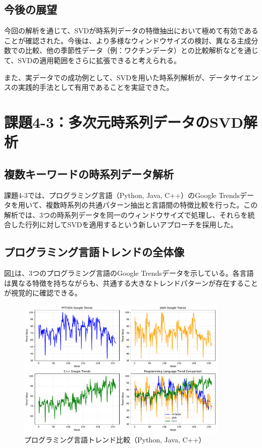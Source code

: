 \documentclass[a4paper,11pt]{jsarticle}
\begin{document}
\subsection{今後の展望}

今回の解析を通じて、SVDが時系列データの特徴抽出において極めて有効であることが確認された。今後は、より多様なウィンドウサイズの検討、異なる主成分数での比較、他の季節性データ（例：ワクチンデータ）との比較解析などを通じて、SVDの適用範囲をさらに拡張できると考えられる。

また、実データでの成功例として、SVDを用いた時系列解析が、データサイエンスの実践的手法として有用であることを実証できた。

\section{課題4-3：多次元時系列データのSVD解析}

\subsection{複数キーワードの時系列データ解析}

課題4-3では、プログラミング言語（Python, Java, C++）のGoogle Trendsデータを用いて、複数時系列の共通パターン抽出と言語間の特徴比較を行った。この解析では、3つの時系列データを同一のウィンドウサイズで処理し、それらを統合した行列に対してSVDを適用するという新しいアプローチを採用した。

\subsection{プログラミング言語トレンドの全体像}

図\ref{fig:multilang-trends}は、3つのプログラミング言語のGoogle Trendsデータを示している。各言語は異なる特徴を持ちながらも、共通する大きなトレンドパターンが存在することが視覚的に確認できる。

\begin{figure}[H]
\centering
\includegraphics[width=0.9\textwidth]{figures/fig7_multilang_trends.pdf}
\caption{プログラミング言語トレンド比較（Python, Java, C++）}
\label{fig:multilang-trends}
\end{figure}
\end{document}
